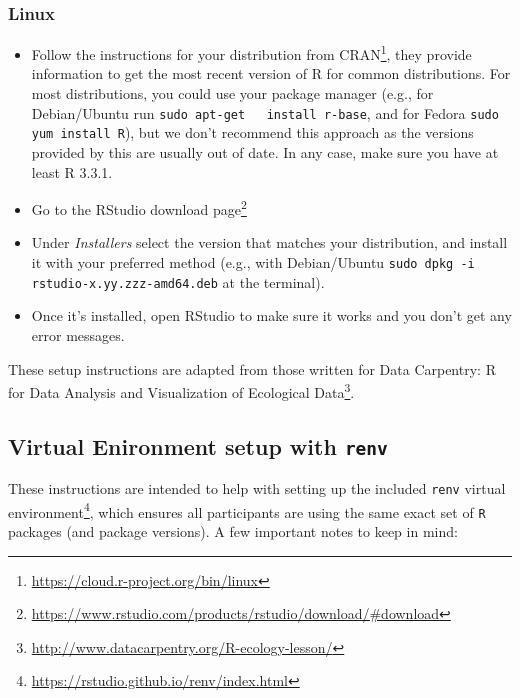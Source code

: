 \documentclass[
  12pt,
]{book}
\newcommand{\passthrough}[1]{#1}
\providecommand{\tightlist}{%
  \setlength{\itemsep}{0pt}\setlength{\parskip}{0pt}}
\renewcommand{\href}[2]{#2\footnote{\url{#1}}}
\theoremstyle{definition}
\theoremstyle{definition}
\theoremstyle{definition}
\newcommand{\1}{\mathbbm{1}}
\begin{document}
\hypertarget{linux}{%
\subsubsection{Linux}\label{linux}}

\begin{itemize}
\tightlist
\item
  Follow the instructions for your distribution from
  \href{https://cloud.r-project.org/bin/linux}{CRAN}, they provide information to get
  the most recent version of R for common distributions. For most distributions,
  you could use your package manager (e.g., for Debian/Ubuntu run \passthrough{\lstinline!sudo apt-get   install r-base!}, and for Fedora \passthrough{\lstinline!sudo yum install R!}), but we don't recommend
  this approach as the versions provided by this are usually out of date. In any
  case, make sure you have at least R 3.3.1.
\item
  Go to the \href{https://www.rstudio.com/products/rstudio/download/\#download}{RStudio download
  page}
\item
  Under \emph{Installers} select the version that matches your distribution, and
  install it with your preferred method (e.g., with Debian/Ubuntu \passthrough{\lstinline!sudo dpkg -i   rstudio-x.yy.zzz-amd64.deb!} at the terminal).
\item
  Once it's installed, open RStudio to make sure it works and you don't get any
  error messages.
\end{itemize}

These setup instructions are adapted from those written for \href{http://www.datacarpentry.org/R-ecology-lesson/}{Data Carpentry: R
for Data Analysis and Visualization of Ecological
Data}.

\hypertarget{renv}{%
\subsection{\texorpdfstring{Virtual Enironment setup with \texttt{renv}}{Virtual Enironment setup with renv}}\label{renv}}

These instructions are intended to help with setting up the included \href{https://rstudio.github.io/renv/index.html}{\passthrough{\lstinline!renv!}
virtual environment}, which ensures
all participants are using the same exact set of \passthrough{\lstinline!R!} packages (and package
versions). A few important notes to keep in mind:
\end{document}
